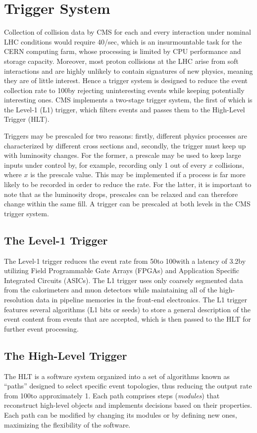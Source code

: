 \section{Trigger System}
\label{sec:trigger}
Collection of collision data by CMS for each and every interaction under nominal LHC conditions would require 40\TB/sec, which is an insurmountable task for the CERN computing farm, whose processing is limited by CPU performance and storage capacity.
Moreover, most proton collisions at the LHC arise from soft interactions and are highly unlikely to contain signatures of new physics, meaning they are of little interest.
Hence a trigger system is designed to reduce the event collection rate to 100\KHz by rejecting uninteresting events while keeping potentially interesting ones.
CMS implements a two-stage trigger system, the first of which is the Level-1 (L1) trigger, which filters events and passes them to the High-Level Trigger (HLT).

Triggers may be prescaled for two reasons:
firstly, different physics processes are characterized by different cross sections and,
secondly, the trigger must keep up with luminosity changes.
For the former, a prescale may be used to keep large inputs under control by, for example, recording only 1 out of every $x$ collisions, where $x$ is the prescale value.
This may be implemented if a process is far more likely to be recorded in order to reduce the rate.
For the latter, it is important to note that as the luminosity drops, prescales can be relaxed and can therefore change within the same fill.
A trigger can be prescaled at both levels in the CMS trigger system.

\subsection{The Level-1 Trigger}
\label{sec:L1_trig}
The Level-1 trigger reduces the event rate from 50\MHz to 100\KHz with a latency of 3.2\mus by utilizing Field Programmable Gate Arrays (FPGAs) and Application Specific Integrated Circuits (ASICs).
The L1 trigger uses only coarsely segmented data from the calorimeters and muon detectors while maintaining all of the high-resolution data in pipeline memories in the front-end electronics.
The L1 trigger features several algorithms (L1 bits or seeds) to store a general description of the event content from events that are accepted, which is then passed to the HLT for further event processing.

\subsection{The High-Level Trigger}
\label{sec:hlt}
The HLT is a software system organized into a set of algorithms known as ``paths'' designed to select specific event topologies, thus reducing the output rate from 100\KHz to approximately 1\KHz.
Each path comprises steps (\emph{modules}) that reconstruct high-level objects and implements decisions based on their properties.
Each path can be modified by changing its modules or by defining new ones, maximizing the flexibility of the software.

